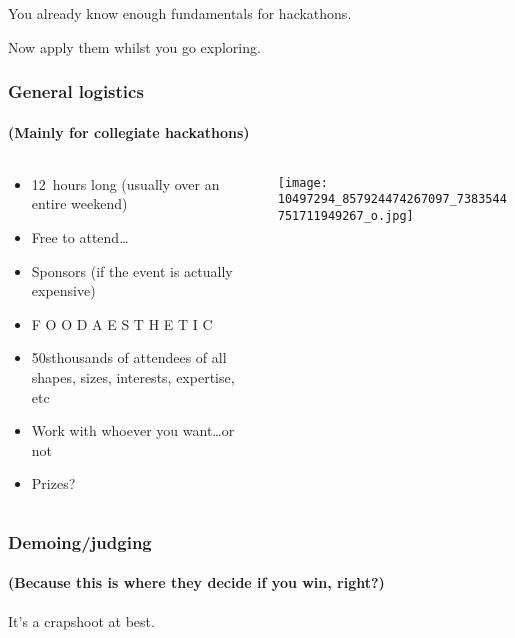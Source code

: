 \documentclass{beamer}
\begin{document}
\begin{frame}
\begin{center}
{\Large You already know enough fundamentals for hackathons.}

{\Large Now apply them whilst you go exploring.}
\end{center}
\end{frame}

\begin{frame}
\frametitle{General logistics}
\framesubtitle{(Mainly for collegiate hackathons)}
\begin{columns}[T]
\begin{column}{0.5\textwidth}
\begin{itemize}
\item 12~hours long (usually over an entire weekend)
\item Free to attend\ldots
\item Sponsors (if the event is actually expensive)
\item F O O D A E S T H E T I C
\item 50s\textendash thousands of attendees of all shapes, sizes, interests, expertise, etc
\item Work with whoever you want\ldots or not
\item Prizes?
\end{itemize}
\end{column}

\begin{column}{0.5\textwidth}
\texttt{[image: 10497294\_857924474267097\_7383544751711949267\_o.jpg]}
\end{column}
\end{columns}
\end{frame}

\begin{frame}
\frametitle{Demoing/judging}
\framesubtitle{(Because this is where they decide if you win, right?)}
\pause
\begin{center}
{\Huge It's a crapshoot at best.}
\end{center}
\end{frame}
\end{document}
